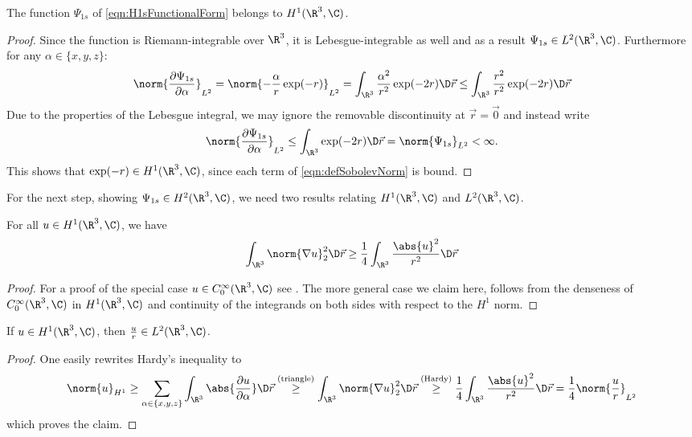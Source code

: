 \begin{exmp}
	\label{exmp:H1sH1}
	The function $\Psi_{1s}$ of \eqref{eqn:H1sFunctionalForm} belongs to $H^1(\R^3, \C)$.
	\begin{proof}
	Since the function is Riemann-integrable over $\R^3$,
	it is Lebesgue-integrable as well
	and as a result $\Psi_{1s} \in L^2(\R^3, \C)$.
	Furthermore for any $\alpha \in \{x, y, z\}$:
	\begin{equation}
		\norm{ \frac{\partial \Psi_{1s}}{\partial \alpha} }_{L^2}
		= \norm{ - \frac{\alpha}{r} \exp(-r) }_{L^2}
		= \int_{\R^3} \frac{\alpha^2}{r^2} \exp(-2r) \D\vec{r}
		\leq \int_{\R^3} \frac{r^2}{r^2} \exp(-2r) \D\vec{r}
		\label{eqn:ProofH1sH1}
	\end{equation}
	Due to the properties of the Lebesgue integral,
	we may ignore the removable discontinuity at $\vec{r} = \vec{0}$
	and instead write
	\[ \norm{ \frac{\partial \Psi_{1s}}{\partial \alpha} }_{L^2}
		\leq \int_{\R^3} \exp(-2r) \D\vec{r} = \norm{\Psi_{1s}}_{L^2} < \infty. \]
	This shows that $\exp(-r) \in H^1(\R^3, \C)$,
	since each term of \eqref{eqn:defSobolevNorm} is bound.
	\end{proof}
\end{exmp}

For the next step, showing $\Psi_{1s} \in H^2(\R^3, \C)$,
we need two results relating $H^1(\R^3, \C)$ and $L^2(\R^3, \C)$.
\begin{prop}
	\label{prop:Hardy}
	For all $u \in H^1(\R^3, \C)$, we have
	\[ \int_{\R^3} \norm{\nabla u}_2^2 \D\vec{r}
		\geq \frac{1}{4} \int_{\R^3} \frac{\abs{u}^2}{r^2} \D\vec{r} \]
	\begin{proof}
		For a proof of the special case $u \in C_0^\infty(\R^3, \C)$
		see \cite[p. 30]{Helffer2013}.
		The more general case we claim here,
		follows from the denseness of $C_0^\infty(\R^3, \C)$ in $H^1(\R^3, \C)$
		and continuity of the integrands on both sides
		with respect to the $H^1$ norm.
	\end{proof}
\end{prop}

\begin{cor}
	\label{cor:Hardy}
	If $u \in H^1(\R^3, \C)$, then $\frac{u}{r} \in L^2(\R^3, \C)$.
	\begin{proof}
		One easily rewrites Hardy's inequality to
		\[
			\norm{u}_{H^1} \geq  \sum_{\alpha\in\{x,y,z\}} \int_{\R^3} \abs{\frac{\partial u}{\partial \alpha}} \D\vec{r}
			\stackrel{\text{(triangle)}}{\geq}
			\int_{\R^3} \norm{\nabla u}_2^2 \D\vec{r}
			\stackrel{\text{(Hardy)}}{\geq}
			\frac{1}{4} \int_{\R^3} \frac{\abs{u}^2}{r^2} \D\vec{r}
			= \frac{1}{4} \norm{\frac{u}{r}}_{L^2}
		\]
		which proves the claim.
	\end{proof}
\end{cor}

